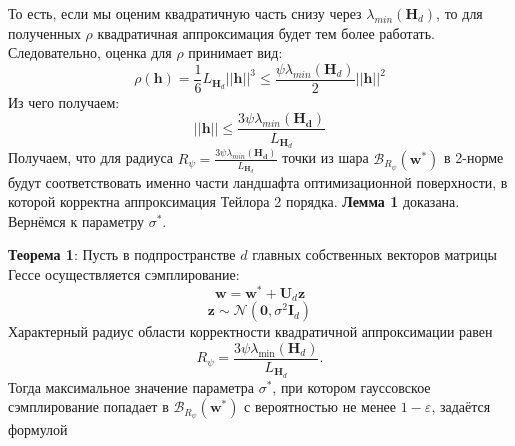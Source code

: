 \documentclass[11pt,a4paper]{article}
\begin{document}
То есть, если мы оценим квадратичную часть снизу через $\lambda_{min}(\mathbf{H}_d)$, то для полученных $\rho$ квадратичная аппроксимация будет тем более работать.
Следовательно, оценка для $\rho$ принимает вид:
$$\rho(\mathbf{h}) = \frac{1}{6}L_{\mathbf{H}_d}||\mathbf{h}||^3 \leq  \frac{\psi \lambda_{min}(\mathbf{H}_d)}{2}||\mathbf{h}||^2$$
Из чего получаем:
$$||\mathbf{h}|| \leq \frac{3\psi \lambda_{min}(\mathbf{H_d})}{L_{\mathbf{H}_d}}$$
Получаем, что для радиуса $R_{\psi} = \frac{3\psi \lambda_{min}(\mathbf{H_d})}{L_{\mathbf{H}_d}}$ точки из шара $\mathcal{B}_{R_{\psi}}(\mathbf{w}^*)$ в 2-норме будут соответствовать именно части ландшафта оптимизационной поверхности, в которой корректна аппроксимация Тейлора 2 порядка. \newline
\textbf{Лемма 1} доказана. \newline
Вернёмся к параметру $\sigma^*$.


\textbf{Теорема 1}: Пусть в подпространстве $d$ главных собственных векторов матрицы Гессе осуществляется сэмплирование:
$$\mathbf{w} = \mathbf{w}^{*} + \mathbf{U}_d \mathbf{z}$$ 
$$\mathbf{z} \sim \mathcal{N}(\mathbf{0}, \sigma^2 \mathbf{I}_d)$$
Характерный радиус области корректности квадратичной аппроксимации равен
$$R_{\psi} = \frac{3 \psi \lambda_{\min}(\mathbf{H}_d)}{L_{\mathbf{H}_d}}.$$
Тогда максимальное значение параметра $\sigma^{*}$, при котором гауссовское сэмплирование попадает в $\mathcal{B}_{R_\psi}(\mathbf{w}^*)$ с вероятностью не менее $1-\varepsilon$, задаётся формулой
\end{document}
